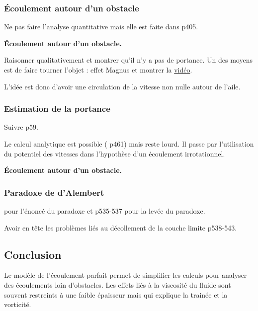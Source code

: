 \subsubsection{Écoulement autour d'un obstacle}

Ne pas faire l'analyse quantitative mais elle est faite dans \cite{Olivier2000} p405.

\begin{slide}
\textbf{Écoulement autour d'un obstacle.}
\end{slide}

Raisonner qualitativement et montrer qu'il n'y a pas de portance.
Un des moyens est de faire tourner l'objet : effet Magnus et montrer la \href{https://youtu.be/05zF0sBwHe8?t=85}{vidéo}.

\begin{transition}
L'idée est donc d'avoir une circulation de la vitesse non nulle autour de l'aile.
\end{transition}

\subsubsection{Estimation de la portance}

Suivre \cite{Rabaud2019} p59.

\begin{remarque}
Le calcul analytique est possible (\cite{Olivier2000} p461) mais reste lourd.
Il passe par l'utilisation du potentiel des vitesses dans l'hypothèse d'un écoulement irrotationnel. 
\end{remarque}

\begin{slide}
\textbf{Écoulement autour d'un obstacle.}
\end{slide}

\subsubsection{Paradoxe de d'Alembert}

\cite{Rabaud2019} pour l'énoncé du paradoxe et \cite{Guyon2001} p535-537 pour la levée du paradoxe.

\begin{remarque}
Avoir en tête les problèmes liés au décollement de la couche limite \cite{Guyon2001} p538-543.
\end{remarque}

\subsection*{Conclusion}

Le modèle de l'écoulement parfait permet de simplifier les calculs pour analyser des écoulements loin d'obstacles.
Les effets liés à la viscosité du fluide sont souvent restreints à une faible épaisseur mais qui explique la trainée et la vorticité.

\newpage